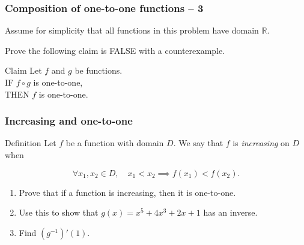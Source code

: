 \documentclass[14pt]{beamer}
\newcommand {\R}{\mathbb{R}}
\newcommand{\p}{\pause}
\begin{document}
\begin{frame}[t]
\frametitle{Composition of one-to-one functions -- 3}

Assume for simplicity that all functions in this problem have domain $\R$.

\vfill

Prove the following claim is FALSE with a counterexample.

\vfill


\begin{block}{Claim }
Let $f$ and $g$ be functions. \\
IF $f \circ g$ is one-to-one, \\
THEN $f$ is one-to-one.
\end{block}

\vfill

\end{frame}

\begin{frame}[t]
\frametitle{Increasing and one-to-one}

\begin{block}{Definition}
Let $f$ be a function with domain $D$. We say that $f$ is \emph{increasing} on $D$ when

$$\forall x_1, x_2 \in D,  \quad x_1<x_2 \implies f(x_1)<f(x_2).
$$
\end{block}

\begin{enumerate}
\item Prove that if a function is increasing, then it is one-to-one.
\p
\item Use this to show that $g(x) = x^5 + 4x^3 + 2x + 1$ has an inverse.
\item Find $(g ^{-1})'(1)$.
\end{enumerate}


\end{frame}
\end{document}
